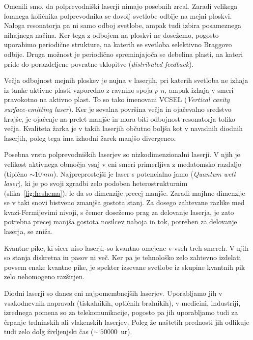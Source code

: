 \begin{remark}
Omenili smo, da polprevodniški laserji nimajo posebnih zrcal. Zaradi velikega lomnega
količnika polprevodnika se dovolj svetlobe odbije na mejni ploskvi. Naloga resonatorja pa ni 
samo odboj svetlobe, ampak tudi izbira posameznega nihajnega načina. Ker tega z odbojem 
na ploskvi ne dosežemo, pogosto uporabimo periodične strukture, na katerih se svetloba selektivno
Braggovo odbije. Druga možnost je periodično spreminjajoča se debelina plasti, na kateri pride
do porazdeljene povratne sklopitve ({\it distributed feedback}). 
 
Večja odbojnost mejnih ploskev je nujna v laserjih, pri katerih svetloba ne izhaja iz
tanke aktivne plasti vzporedno z ravnino spoja $p$-$n$, ampak izhaja v smeri pravokotno na aktivno plast.
To so tako imenovani VCSEL ({\it Vertical cavity surface-emitting laser}). Ker je sevalna površina večja in 
ojačevalno sredstvo krajše, je ojačenje na prelet manjše in mora biti odbojnost resonatorja toliko večja. 
Kvaliteta žarka je v takih laserjih občutno boljša kot v navadnih diodnih laserjih, poleg tega ima izhodni 
žarek manjšo divergenco.
\end{remark}

\begin{remark}
Posebna vrsta polprevodniških laserjev so nizkodimenzionalni laserji. V njih je 
velikost aktivnega območja vsaj v eni smeri primerljiva z medatomsko razdaljo (tipično $\sim 10~\si{nm}$).
Najpreprostejši je laser s potencialno jamo ({\it Quantum well laser}), ki 
je po svoji zgradbi zelo podoben heterostrukturnim (slika~\ref{fig:heshema}), le da so dimenzije precej
manjše. Zaradi majhne dimenzije se v taki snovi bistveno zmanjša gostota stanj. 
Za dosego zahtevane razlike med kvazi-Fermijevimi nivoji, s čemer dosežemo prag za delovanje laserja,
je zato potrebna precej manjša gostota nosilcev naboja in tok, potreben za delovanje laserja,
se zniža. 

Kvantne pike, ki sicer niso laserji, so kvantno omejene v vseh treh smereh. 
V njih so stanja diskretna in pasov ni več. Ker pa je tehnološko zelo zahtevno izdelati povsem enake
kvantne pike, je spekter izsevane svetlobe iz skupine kvantnih pik zelo nehomogeno razširjen. 
\end{remark}

Diodni laserji so danes eni najpomembnejših laserjev. Uporabljamo jih v vsakodnevnih napravah 
(tiskalnikih, optičnih bralnikih), v medicini, industriji, izrednega
pomena so za telekomunikacije, pogosto pa jih uporabljamo tudi za 
črpanje trdninskih ali vlakenskih laserjev. 
Poleg že naštetih prednosti jih odlikuje tudi zelo dolg življenjski čas ($\sim~50 000$~ur). 

